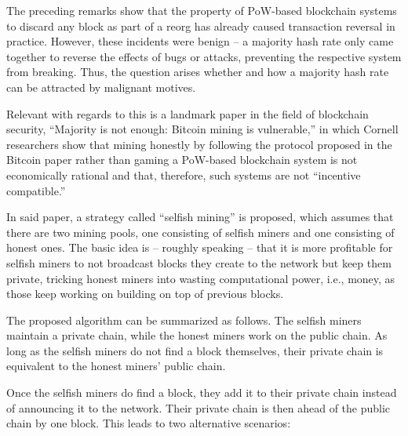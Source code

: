 The preceding remarks show that the property of PoW-based blockchain systems to discard any block as part of a reorg has already caused transaction reversal in practice.
However, these incidents were benign -- a majority hash rate only came together to reverse the effects of bugs or attacks, preventing the respective system from breaking.
Thus, the question arises whether and how a majority hash rate can be attracted by malignant motives.

Relevant with regards to this is a landmark paper in the field of blockchain security, ``Majority is not enough: Bitcoin mining is vulnerable,'' \autocite{eyal2014} in which  Cornell researchers show that mining honestly by following the protocol proposed in the Bitcoin paper rather than gaming a PoW-based blockchain system is not economically rational and that, therefore, such systems are not ``incentive compatible.'' \autocite[1]{eyal2014}

In said paper, a strategy called ``selfish mining'' is proposed, which assumes that there are two mining pools, one consisting of selfish miners and one consisting of honest ones.
The basic idea is -- roughly speaking -- that it is more profitable for selfish miners to not broadcast blocks they create to the network but keep them private, tricking honest miners into wasting computational power, i.e., money, as those keep working on building on top of previous blocks.

The proposed algorithm can be summarized as follows.
The selfish miners maintain a private chain, while the honest miners work on the public chain.
As long as the selfish miners do not find a block themselves, their private chain is equivalent to the honest miners’ public chain.

Once the selfish miners do find a block, they add it to their private chain instead of announcing it to the network.
Their private chain is then ahead of the public chain by one block.
This leads to two alternative scenarios:

